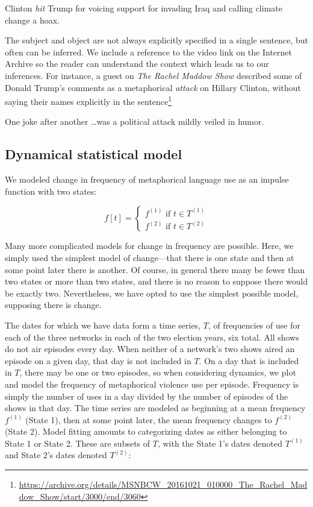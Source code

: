 \begin{exe}
  \ex Clinton \emph{hit} Trump for voicing support for invading Iraq and calling
    climate change a hoax.
\end{exe}
The subject and object are not always explicitly
specified in a single sentence, but often can be inferred. We include
a reference to the video link on the Internet Archive so the reader can understand
the context which leads us to our inferences.
For instance, a guest on \emph{The Rachel Maddow Show}
described some of Donald Trump's comments as a metaphorical 
\emph{attack} on Hillary Clinton, without saying their names explicitly in the sentence\footnote{\url{https://archive.org/details/MSNBCW_20161021_010000_The_Rachel_Maddow_Show/start/3000/end/3060}}

\begin{exe}
  \ex One joke after another \ldots was a political attack mildly veiled in
  humor.
\end{exe}


\subsection{Dynamical statistical model}

We modeled change in frequency of metaphorical language use as an impulse
function with two states:

\begin{equation} \label{eq:model} 
  f[t] = \begin{cases} f^{(1)} \text{ if } t \in T^{(1)} \\
f^{(2)} \text{ if } t \in T^{(2)} 
  \end{cases} 
\end{equation}
\noindent

Many more complicated models for change in frequency are possible. Here, we
simply used the simplest model of change---that there is one state and then at
some point later there is another.  Of course, in general there many be fewer
than two states or more than two states, and there is no reason to suppose there
would be exactly two.  Nevertheless, we have opted to use the simplest possible
model, supposing there is change.

The dates for which we have data form a time series, $T$, of frequencies of use
for each of the three networks in each of the two election years, six total. All
shows do not air episodes every day. When neither of a network's two shows aired
an episode on a given day, that day is not included in $T$. On a day that is
included in $T$, there may be one or two episodes, so when considering dynamics,
we plot and model the frequency of metaphorical violence use per episode.
Frequency is simply the number of uses in a day divided by the number of
episodes of the shows in that day. The time series are modeled as beginning at a
mean frequency $f^{(1)}$ (State 1), then at some point later, the mean frequency
changes to $f^{(2)}$ (State 2). Model fitting amounts to categorizing dates as
either belonging to State 1 or State 2. These are subsets of $T$, with the State
1's dates denoted $T^{(1)}$ and State 2's dates denoted $T^{(2)}$:

